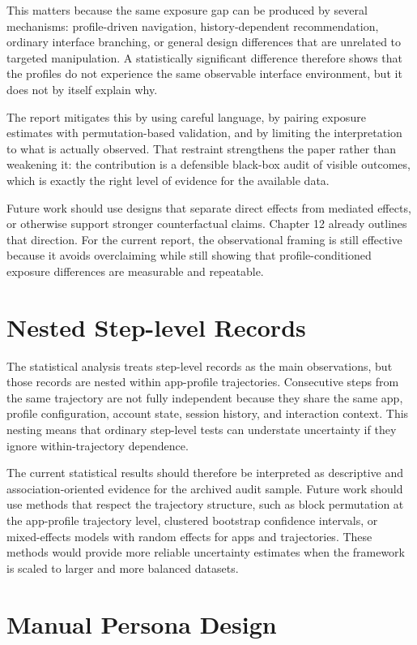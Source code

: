 This matters because the same exposure gap can be produced by several mechanisms: profile-driven navigation, history-dependent recommendation, ordinary interface branching, or general design differences that are unrelated to targeted manipulation. A statistically significant difference therefore shows that the profiles do not experience the same observable interface environment, but it does not by itself explain why.

The report mitigates this by using careful language, by pairing exposure estimates with permutation-based validation, and by limiting the interpretation to what is actually observed. That restraint strengthens the paper rather than weakening it: the contribution is a defensible black-box audit of visible outcomes, which is exactly the right level of evidence for the available data.

Future work should use designs that separate direct effects from mediated effects, or otherwise support stronger counterfactual claims. Chapter 12 already outlines that direction. For the current report, the observational framing is still effective because it avoids overclaiming while still showing that profile-conditioned exposure differences are measurable and repeatable.

\section{Nested Step-level Records}

The statistical analysis treats step-level records as the main observations, but those records are nested within app-profile trajectories. Consecutive steps from the same trajectory are not fully independent because they share the same app, profile configuration, account state, session history, and interaction context. This nesting means that ordinary step-level tests can understate uncertainty if they ignore within-trajectory dependence.

The current statistical results should therefore be interpreted as descriptive and association-oriented evidence for the archived audit sample. Future work should use methods that respect the trajectory structure, such as block permutation at the app-profile trajectory level, clustered bootstrap confidence intervals, or mixed-effects models with random effects for apps and trajectories. These methods would provide more reliable uncertainty estimates when the framework is scaled to larger and more balanced datasets.

\section{Manual Persona Design}

